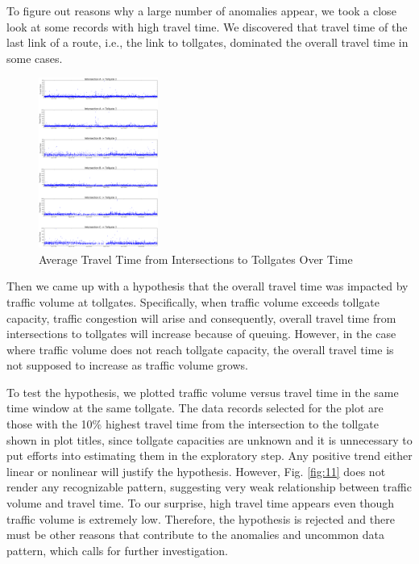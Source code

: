 \documentclass[journal, letterpaper]{IEEEtran}
\begin{document}
To figure out reasons why a large number of anomalies appear, we took a close look at some records with high travel time. We discovered that travel time of the last link of a route, i.e., the link to tollgates, dominated the overall travel time in some cases. 

\begin{figure} [H]
  \centering
  \includegraphics[width=0.35\textwidth]{intersection-tollgate-time-2.png}
  \caption{Average Travel Time from Intersections to Tollgates Over Time}
  \captionsetup{justification=centering}
  \label{fig:10}
\end{figure}

Then we came up with a hypothesis that the overall travel time was impacted by traffic volume at tollgates. Specifically, when traffic volume exceeds tollgate capacity, traffic congestion will arise and consequently, overall travel time from intersections to tollgates will increase because of queuing. However, in the case where traffic volume does not reach tollgate capacity, the overall travel time is not supposed to increase as traffic volume grows. 

To test the hypothesis, we plotted traffic volume versus travel time in the same time window at the same tollgate. The data records selected for the plot are those with the 10\% highest travel time from the intersection to the tollgate shown in plot titles, since tollgate capacities are unknown and it is unnecessary to put efforts into estimating them in the exploratory step. Any positive trend either linear or nonlinear will justify the hypothesis. However, Fig. \ref{fig:11} does not render any recognizable pattern, suggesting very weak relationship between traffic volume and travel time. To our surprise, high travel time appears even though traffic volume is extremely low. Therefore, the hypothesis is rejected and there must be other reasons that contribute to the anomalies and uncommon data pattern, which calls for further investigation. 
\end{document}
